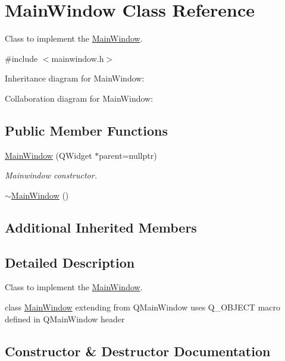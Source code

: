 \hypertarget{classMainWindow}{}\section{Main\+Window Class Reference}
\label{classMainWindow}


Class to implement the \hyperlink{classMainWindow}{Main\+Window}.  




{\ttfamily \#include $<$mainwindow.\+h$>$}



Inheritance diagram for Main\+Window\+:


Collaboration diagram for Main\+Window\+:
\subsection*{Public Member Functions}
\begin{DoxyCompactItemize}
\item 
\hyperlink{classMainWindow_a996c5a2b6f77944776856f08ec30858d}{Main\+Window} (Q\+Widget $\ast$parent=nullptr)
\begin{DoxyCompactList}\small\item\em Mainwindow constructor. \end{DoxyCompactList}\item 
\hyperlink{classMainWindow_ae98d00a93bc118200eeef9f9bba1dba7}{$\sim$\+Main\+Window} ()
\end{DoxyCompactItemize}
\subsection*{Additional Inherited Members}


\subsection{Detailed Description}
Class to implement the \hyperlink{classMainWindow}{Main\+Window}. 

class \hyperlink{classMainWindow}{Main\+Window} extending from Q\+Main\+Window uses Q\+\_\+\+O\+B\+J\+E\+CT macro defined in Q\+Main\+Window header 

\subsection{Constructor \& Destructor Documentation}
\mbox{\label{classMainWindow_a996c5a2b6f77944776856f08ec30858d}} 
